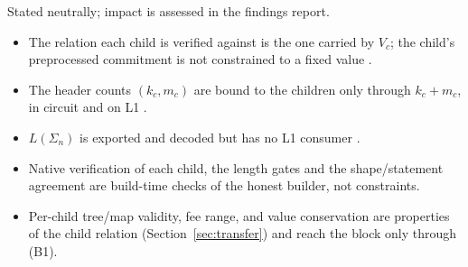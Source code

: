 Stated neutrally; impact is assessed in the findings report.
\begin{itemize}
\item The relation each child is verified against is the one carried by $V_c$;
  the child's preprocessed commitment is not constrained to a fixed value
  .
\item The header counts $(k_c,m_c)$ are bound to the children only through
  $k_c+m_c$, in circuit and on L1 .
\item $L(\Sigma_n)$ is exported and decoded but has no L1 consumer
  .
\item Native verification of each child, the length gates and the shape/statement
  agreement are build-time checks of the honest builder, not constraints.
\item Per-child tree/map validity, fee range, and value conservation are
  properties of the child relation (Section~\ref{sec:transfer}) and reach the block only
  through (B1).
\end{itemize}
